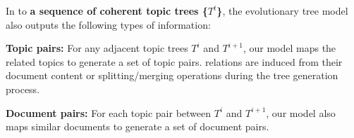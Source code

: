 In  to \textbf{\normalsize a sequence of coherent topic trees \{${T^t}$\}}, the evolutionary tree model also outputs the following types of information:

\begin{compactitem}
\item \textbf{\normalsize Topic pairs:} For any adjacent topic trees $T^i$ and $T^{i+1}$, our model maps the related topics  to generate a set of topic pairs.  relations are  induced from their document content or  splitting/merging operations  during the tree generation process.
\item \textbf{\normalsize Document pairs:} For each topic pair between $T^i$ and $T^{i+1}$, our model also maps similar documents  to generate a set of document pairs.
\end{compactitem}



